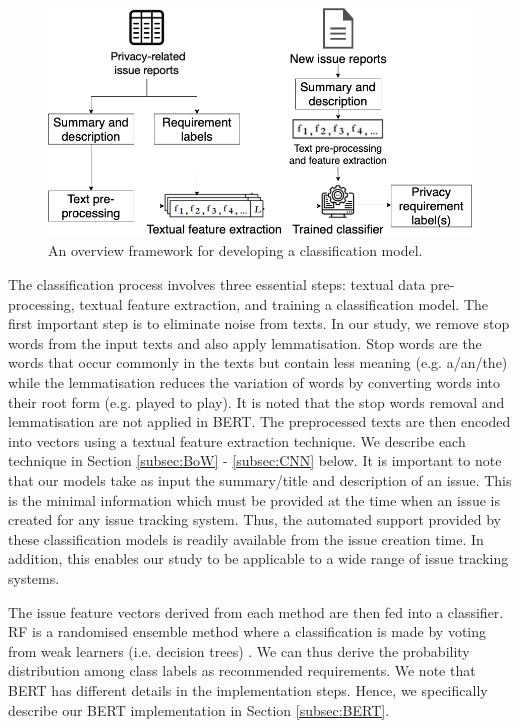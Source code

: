 \begin{figure}[H]
	\centering
	\includegraphics[width=0.8\linewidth]{"Figures/framework_new"}
	\caption{An overview framework for developing a classification model.}
	\label{fig:framework}
\end{figure}

The classification process involves three essential steps: textual data pre-processing, textual feature extraction, and training a classification model. The first important step is to eliminate noise from texts. In our study, we remove stop words from the input texts and also apply lemmatisation. Stop words are the words that occur commonly in the texts but contain less meaning (e.g. a/an/the) while the lemmatisation reduces the variation of words by converting words into their root form (e.g. played to play). It is noted that the stop words removal and lemmatisation are not applied in BERT. The preprocessed texts are then encoded into vectors using a textual feature extraction technique. We describe each technique in Section \ref{subsec:BoW} - \ref{subsec:CNN} below. It is important to note that our models take as input the summary/title and description of an issue. This is the minimal information which must be provided at the time when an issue is created for any issue tracking system. Thus, the automated support provided by these classification models is readily available from the issue creation time. In addition, this enables our study to be applicable to a wide range of issue tracking systems.

The issue feature vectors derived from each method are then fed into a classifier.  RF is a randomised ensemble method where a classification is made by voting from weak learners (i.e. decision trees) \cite{blei2003latent}. We can thus derive the probability distribution among class labels as recommended requirements. We note that BERT has different details in the implementation steps. Hence, we specifically describe our BERT implementation in Section \ref{subsec:BERT}.


